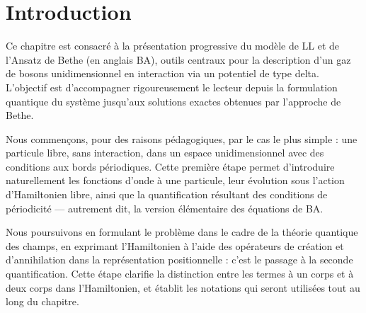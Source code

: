 %
%
%
%

\section*{Introduction}

Ce chapitre est consacré à la présentation progressive du modèle de \acrfull{LL} et de l’Ansatz de Bethe (en anglais \gls{BA}), outils centraux pour la description d’un gaz de bosons unidimensionnel en interaction via un potentiel de type delta. L’objectif est d’accompagner rigoureusement le lecteur depuis la formulation quantique du système jusqu’aux solutions exactes obtenues par l’approche de Bethe.

\medskip

Nous commençons, pour des raisons pédagogiques, par le cas le plus simple : une particule libre, sans interaction, dans un espace unidimensionnel avec des conditions aux bords périodiques. Cette première étape permet d’introduire naturellement les fonctions d’onde à une particule, leur évolution sous l’action d'Hamiltonien libre, ainsi que la quantification résultant des conditions de périodicité — autrement dit, la version élémentaire des équations de \gls{BA}.

\medskip
Nous poursuivons en formulant le problème dans le cadre de la théorie quantique des champs, en exprimant l’Hamiltonien à l’aide des opérateurs de création et d’annihilation dans la représentation positionnelle : c’est le passage à la seconde quantification. Cette étape clarifie la distinction entre les termes à un corps et à deux corps dans l’Hamiltonien, et établit les notations qui seront utilisées tout au long du chapitre.


